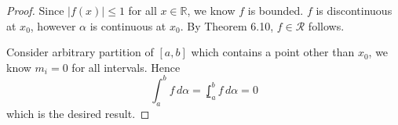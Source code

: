 \begin{Exercise}
	\begin{proof}
		Since $|f(x)| \leq 1$ for all $x\in\mathbb{R}$, we know $f$ is bounded.
		$f$ is discontinuous at $x_0$, however $\alpha$ is continuous at $x_0$.
		By Theorem 6.10, $f\in\mathcal{R}$ follows.
		
		Consider arbitrary partition of $[a,b]$ which contains a point other than $x_0$, we know $m_i=0$ for all intervals. Hence
		$$
		\int_{a}^{b} f\,d\alpha 
		= \lowint_{a}^{b} f\,d\alpha
		= 0
		$$
		which is the desired result.
	\end{proof}
\end{Exercise}